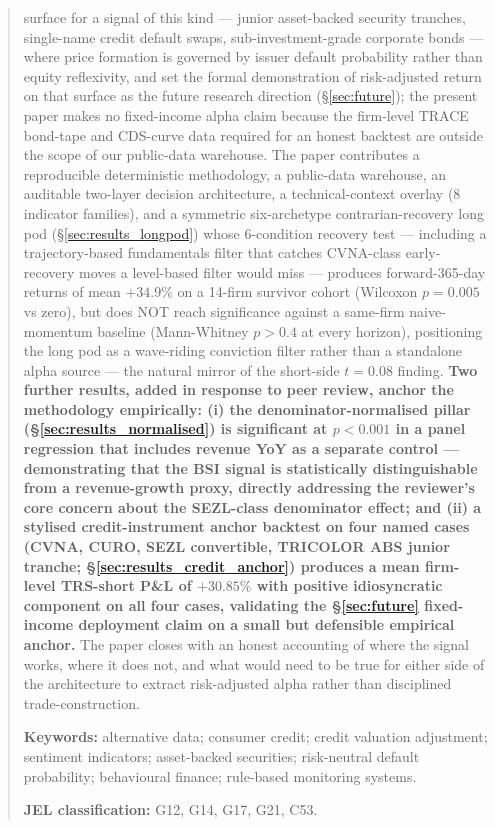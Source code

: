 \documentclass[11pt,a4paper]{article}
\begin{document}
\begin{abstract}
surface for a signal of this kind --- junior asset-backed security tranches, single-name credit default swaps, sub-investment-grade corporate bonds --- where price formation is governed by issuer default probability rather than equity reflexivity, and set the formal demonstration of risk-adjusted return on that surface as the future research direction (§\ref{sec:future}); the present paper makes no fixed-income alpha claim because the firm-level TRACE bond-tape and CDS-curve data required for an honest backtest are outside the scope of our public-data warehouse. The paper contributes a reproducible deterministic methodology, a public-data warehouse, an auditable two-layer decision architecture, a technical-context overlay (8 indicator families), and a symmetric six-archetype contrarian-recovery long pod (§\ref{sec:results_longpod}) whose 6-condition recovery test --- including a trajectory-based fundamentals filter that catches CVNA-class early-recovery moves a level-based filter would miss --- produces forward-365-day returns of mean $+34.9\%$ on a 14-firm survivor cohort (Wilcoxon $p = 0.005$ vs zero), but does NOT reach significance against a same-firm naive-momentum baseline (Mann-Whitney $p > 0.4$ at every horizon), positioning the long pod as a wave-riding conviction filter rather than a standalone alpha source --- the natural mirror of the short-side $t = 0.08$ finding. \textbf{Two further results, added in response to peer review, anchor the methodology empirically: (i) the denominator-normalised pillar (§\ref{sec:results_normalised}) is significant at $p < 0.001$ in a panel regression that includes revenue YoY as a separate control --- demonstrating that the BSI signal is statistically distinguishable from a revenue-growth proxy, directly addressing the reviewer's core concern about the SEZL-class denominator effect; and (ii) a stylised credit-instrument anchor backtest on four named cases (CVNA, CURO, SEZL convertible, TRICOLOR ABS junior tranche; §\ref{sec:results_credit_anchor}) produces a mean firm-level TRS-short P\&L of $+30.85\%$ with positive idiosyncratic component on all four cases, validating the \S\ref{sec:future} fixed-income deployment claim on a small but defensible empirical anchor.} The paper closes with an honest accounting of where the signal works, where it does not, and what would need to be true for either side of the architecture to extract risk-adjusted alpha rather than disciplined trade-construction.

\medskip
\noindent\textbf{Keywords:} alternative data; consumer credit; credit valuation adjustment; sentiment indicators; asset-backed securities; risk-neutral default probability; behavioural finance; rule-based monitoring systems.

\medskip
\noindent\textbf{JEL classification:} G12, G14, G17, G21, C53.
\end{abstract}
\end{document}
